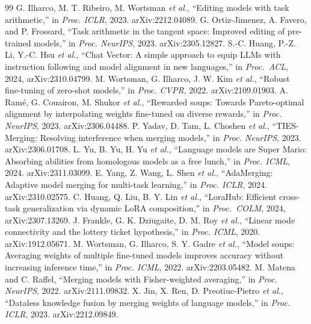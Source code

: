 \documentclass[conference]{IEEEtran}
\begin{document}
\begin{thebibliography}{99}
 G. Ilharco, M. T. Ribeiro, M. Wortsman \emph{et al.}, ``Editing models with task arithmetic,'' in \emph{Proc. ICLR}, 2023. arXiv:2212.04089.
 G. Ortiz-Jimenez, A. Favero, and P. Frossard, ``Task arithmetic in the tangent space: Improved editing of pre-trained models,'' in \emph{Proc. NeurIPS}, 2023. arXiv:2305.12827.
 S.-C. Huang, P.-Z. Li, Y.-C. Hsu \emph{et al.}, ``Chat Vector: A simple approach to equip LLMs with instruction following and model alignment in new languages,'' in \emph{Proc.\ ACL}, 2024, arXiv:2310.04799.
 M. Wortsman, G. Ilharco, J. W. Kim \emph{et al.}, ``Robust fine-tuning of zero-shot models,'' in \emph{Proc. CVPR}, 2022. arXiv:2109.01903.
 A. Ram\'e, G. Couairon, M. Shukor \emph{et al.}, ``Rewarded soups: Towards Pareto-optimal alignment by interpolating weights fine-tuned on diverse rewards,'' in \emph{Proc. NeurIPS}, 2023. arXiv:2306.04488.
 P. Yadav, D. Tam, L. Choshen \emph{et al.}, ``TIES-Merging: Resolving interference when merging models,'' in \emph{Proc. NeurIPS}, 2023. arXiv:2306.01708.
 L. Yu, B. Yu, H. Yu \emph{et al.}, ``Language models are Super Mario: Absorbing abilities from homologous models as a free lunch,'' in \emph{Proc. ICML}, 2024. arXiv:2311.03099.
 E. Yang, Z. Wang, L. Shen \emph{et al.}, ``AdaMerging: Adaptive model merging for multi-task learning,'' in \emph{Proc. ICLR}, 2024. arXiv:2310.02575.
 C. Huang, Q. Liu, B. Y. Lin \emph{et al.}, ``LoraHub: Efficient cross-task generalization via dynamic LoRA composition,'' in \emph{Proc.\ COLM}, 2024, arXiv:2307.13269.
 J. Frankle, G. K. Dziugaite, D. M. Roy \emph{et al.}, ``Linear mode connectivity and the lottery ticket hypothesis,'' in \emph{Proc. ICML}, 2020. arXiv:1912.05671.
 M. Wortsman, G. Ilharco, S. Y. Gadre \emph{et al.}, ``Model soups: Averaging weights of multiple fine-tuned models improves accuracy without increasing inference time,'' in \emph{Proc. ICML}, 2022. arXiv:2203.05482.
 M. Matena and C. Raffel, ``Merging models with Fisher-weighted averaging,'' in \emph{Proc. NeurIPS}, 2022. arXiv:2111.09832.
 X. Jin, X. Ren, D. Preotiuc-Pietro \emph{et al.}, ``Dataless knowledge fusion by merging weights of language models,'' in \emph{Proc. ICLR}, 2023. arXiv:2212.09849.

\end{thebibliography}
\end{document}
